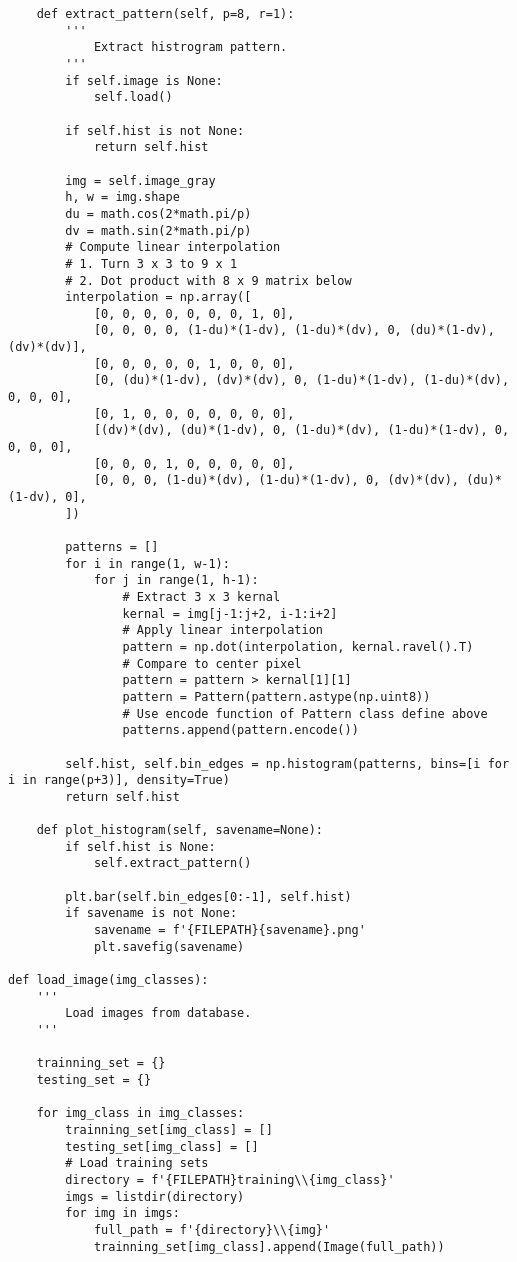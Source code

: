 \documentclass[11pt]{article}
\begin{document}
\begin{lstlisting}
    def extract_pattern(self, p=8, r=1):
        '''
            Extract histrogram pattern.
        '''
        if self.image is None:
            self.load()
        
        if self.hist is not None:
            return self.hist
        
        img = self.image_gray
        h, w = img.shape
        du = math.cos(2*math.pi/p)
        dv = math.sin(2*math.pi/p)
        # Compute linear interpolation
        # 1. Turn 3 x 3 to 9 x 1
        # 2. Dot product with 8 x 9 matrix below
        interpolation = np.array([
            [0, 0, 0, 0, 0, 0, 0, 1, 0],
            [0, 0, 0, 0, (1-du)*(1-dv), (1-du)*(dv), 0, (du)*(1-dv), (dv)*(dv)],
            [0, 0, 0, 0, 0, 1, 0, 0, 0],
            [0, (du)*(1-dv), (dv)*(dv), 0, (1-du)*(1-dv), (1-du)*(dv), 0, 0, 0],
            [0, 1, 0, 0, 0, 0, 0, 0, 0],
            [(dv)*(dv), (du)*(1-dv), 0, (1-du)*(dv), (1-du)*(1-dv), 0, 0, 0, 0],
            [0, 0, 0, 1, 0, 0, 0, 0, 0],
            [0, 0, 0, (1-du)*(dv), (1-du)*(1-dv), 0, (dv)*(dv), (du)*(1-dv), 0],
        ])

        patterns = []
        for i in range(1, w-1):
            for j in range(1, h-1):
                # Extract 3 x 3 kernal
                kernal = img[j-1:j+2, i-1:i+2]
                # Apply linear interpolation
                pattern = np.dot(interpolation, kernal.ravel().T)
                # Compare to center pixel
                pattern = pattern > kernal[1][1]
                pattern = Pattern(pattern.astype(np.uint8))
                # Use encode function of Pattern class define above
                patterns.append(pattern.encode())

        self.hist, self.bin_edges = np.histogram(patterns, bins=[i for i in range(p+3)], density=True)
        return self.hist

    def plot_histogram(self, savename=None):
        if self.hist is None:
            self.extract_pattern() 
        
        plt.bar(self.bin_edges[0:-1], self.hist)
        if savename is not None:
            savename = f'{FILEPATH}{savename}.png'
            plt.savefig(savename)

def load_image(img_classes):
    '''
        Load images from database.
    '''

    trainning_set = {}
    testing_set = {}
    
    for img_class in img_classes:
        trainning_set[img_class] = []
        testing_set[img_class] = []
        # Load training sets
        directory = f'{FILEPATH}training\\{img_class}'
        imgs = listdir(directory)
        for img in imgs:
            full_path = f'{directory}\\{img}'
            trainning_set[img_class].append(Image(full_path))


\end{lstlisting}
\end{document}
